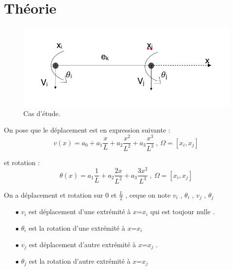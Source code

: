 \documentclass[a4paper,10pt]{report} %
\begin{document}
\chapter{Théorie}











\begin{figure}[H]
\begin{center}
	\includegraphics[width=1\textwidth]{schemaelementk.png} 
\end{center} 
\caption{Cas d'étude.}
\end{figure}



On pose que le déplacement est en expression suivante :
\begin{equation}
v(x)=a_0+a_1\frac{x}{L}+a_2\frac{x^2}{L^2}+a_3\frac{x^3}{L^3} \ ,\  \Omega=[x_i,x_j]
\end{equation}


et rotation :
\begin{equation}
\theta(x)=a_1\frac{1}{L}+a_2\frac{2x}{L^2}+a_3\frac{3x^2}{L^3} \ ,\  \Omega=[x_i,x_j]
\end{equation}

On a déplacement et rotation sur $0$ et $\frac{L}{2}$ , ceque on note $v_i$ , $\theta_i$ , $v_j$ , $\theta_j$ \\
\begin{itemize}
    \item[$\bullet$]$v_i$ est déplacement d'une extrémité à $x$=$x_i$ qui est toujour nulle .
    \item[$\bullet$]$\theta_i$ est la rotation d'une extrémité à $x$=$x_i$
    \item[$\bullet$]$v_j$ est déplacement d'autre extrémité à $x$=$x_j$ .
    \item[$\bullet$]$\theta_j$ est la rotation d'autre extrémité à $x$=$x_j$
\end{itemize}
\end{document}
